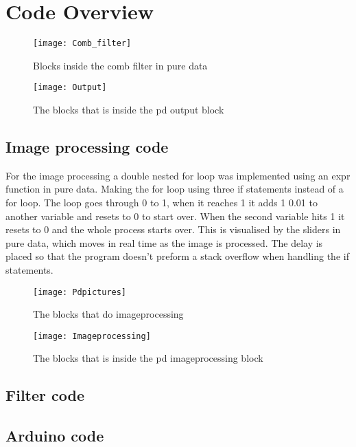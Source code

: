 \chapter{Code Overview}\label{ch:codeoverview}
\begin{figure}
\texttt{[image: Comb\_filter]}
\caption{Blocks inside the comb filter in pure data}
\label{Fig:Comb_filter}
\end{figure}

\begin{figure}
\texttt{[image: Output]}
\caption{The blocks that is inside the pd output block}
\label{Fig:Output}
\end{figure}



\section{Image processing code}
For the image processing a double nested for loop was implemented using an expr function in pure data. Making the for loop using three if statements instead of a for loop. The loop goes through 0 to 1, when it reaches 1 it adds 1 0.01 to another variable and resets to 0 to start over. When the second variable hits 1 it resets to 0 and the whole process starts over. This is visualised by the sliders in pure data, which moves in real time as the image is processed.  
The delay is placed so that the program doesn't preform a stack overflow when handling the if statements. 
\begin{figure}
\texttt{[image: Pdpictures]}
\caption{The blocks that do imageprocessing}
\label{Fig:pdpicture}
\end{figure}

\begin{figure}
\texttt{[image: Imageprocessing]}
\caption{The blocks that is inside the pd imageprocessing block}
\label{Fig:Imageprocessing}
\end{figure}


\section{Filter code}


\section{Arduino code}

